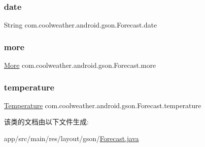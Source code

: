 \subsubsection{\texorpdfstring{date}{date}}
{\footnotesize\ttfamily String com.\+coolweather.\+android.\+gson.\+Forecast.\+date}

\mbox{\label{classcom_1_1coolweather_1_1android_1_1gson_1_1_forecast_a94a13b10173afc0d1294186cbddcdf36}} 
\subsubsection{\texorpdfstring{more}{more}}
{\footnotesize\ttfamily \mbox{\hyperlink{classcom_1_1coolweather_1_1android_1_1gson_1_1_forecast_1_1_more}{More}} com.\+coolweather.\+android.\+gson.\+Forecast.\+more}

\mbox{\label{classcom_1_1coolweather_1_1android_1_1gson_1_1_forecast_aade1de76973c587e9f6ead296e434fde}} 
\subsubsection{\texorpdfstring{temperature}{temperature}}
{\footnotesize\ttfamily \mbox{\hyperlink{classcom_1_1coolweather_1_1android_1_1gson_1_1_forecast_1_1_temperature}{Temperature}} com.\+coolweather.\+android.\+gson.\+Forecast.\+temperature}



该类的文档由以下文件生成\+:\begin{DoxyCompactItemize}
\item 
app/src/main/res/layout/gson/\mbox{\hyperlink{res_2layout_2gson_2_forecast_8java}{Forecast.\+java}}\end{DoxyCompactItemize}
